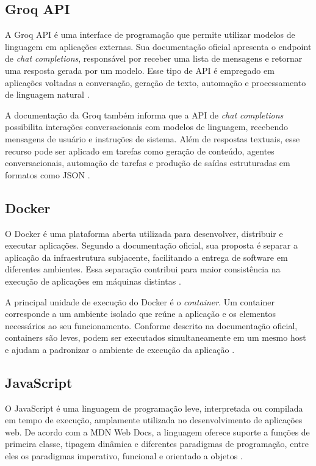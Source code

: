 \subsection{Groq API}

A Groq API é uma interface de programação que permite utilizar modelos de linguagem em aplicações externas. Sua documentação oficial apresenta o endpoint de \textit{chat completions}, responsável por receber uma lista de mensagens e retornar uma resposta gerada por um modelo. Esse tipo de API é empregado em aplicações voltadas a conversação, geração de texto, automação e processamento de linguagem natural \cite{groq_api_reference_2026}.

A documentação da Groq também informa que a API de \textit{chat completions} possibilita interações conversacionais com modelos de linguagem, recebendo mensagens de usuário e instruções de sistema. Além de respostas textuais, esse recurso pode ser aplicado em tarefas como geração de conteúdo, agentes conversacionais, automação de tarefas e produção de saídas estruturadas em formatos como JSON \cite{groq_text_generation_2026}.

\subsection{Docker}

O Docker é uma plataforma aberta utilizada para desenvolver, distribuir e executar aplicações. Segundo a documentação oficial, sua proposta é separar a aplicação da infraestrutura subjacente, facilitando a entrega de software em diferentes ambientes. Essa separação contribui para maior consistência na execução de aplicações em máquinas distintas \cite{docker_overview_2026}.

A principal unidade de execução do Docker é o \textit{container}. Um container corresponde a um ambiente isolado que reúne a aplicação e os elementos necessários ao seu funcionamento. Conforme descrito na documentação oficial, containers são leves, podem ser executados simultaneamente em um mesmo host e ajudam a padronizar o ambiente de execução da aplicação \cite{docker_overview_2026}.

\subsection{JavaScript}

O JavaScript é uma linguagem de programação leve, interpretada ou compilada em tempo de execução, amplamente utilizada no desenvolvimento de aplicações web. De acordo com a MDN Web Docs, a linguagem oferece suporte a funções de primeira classe, tipagem dinâmica e diferentes paradigmas de programação, entre eles os paradigmas imperativo, funcional e orientado a objetos \cite{mdn_javascript_2026}.

